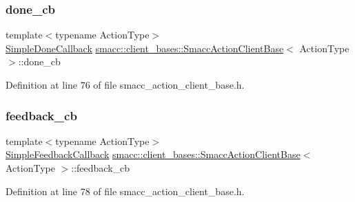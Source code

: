 \subsubsection{\texorpdfstring{done\+\_\+cb}{done\_cb}}
{\footnotesize\ttfamily template$<$typename Action\+Type$>$ \\
\hyperlink{classsmacc_1_1client__bases_1_1SmaccActionClientBase_a56eb842a85c65248fda43909b1aaeac1}{Simple\+Done\+Callback} \hyperlink{classsmacc_1_1client__bases_1_1SmaccActionClientBase}{smacc\+::client\+\_\+bases\+::\+Smacc\+Action\+Client\+Base}$<$ Action\+Type $>$\+::done\+\_\+cb}



Definition at line 76 of file smacc\+\_\+action\+\_\+client\+\_\+base.\+h.

\mbox{\label{classsmacc_1_1client__bases_1_1SmaccActionClientBase_a978629b407530f1b7d266a009eff664b}} 
\subsubsection{\texorpdfstring{feedback\+\_\+cb}{feedback\_cb}}
{\footnotesize\ttfamily template$<$typename Action\+Type$>$ \\
\hyperlink{classsmacc_1_1client__bases_1_1SmaccActionClientBase_a207f1655464affc35459f47a35d04069}{Simple\+Feedback\+Callback} \hyperlink{classsmacc_1_1client__bases_1_1SmaccActionClientBase}{smacc\+::client\+\_\+bases\+::\+Smacc\+Action\+Client\+Base}$<$ Action\+Type $>$\+::feedback\+\_\+cb}



Definition at line 78 of file smacc\+\_\+action\+\_\+client\+\_\+base.\+h.

\mbox{\label{classsmacc_1_1client__bases_1_1SmaccActionClientBase_a7f2e1834e915bdf7ae9db8b90b4597e6}} 
